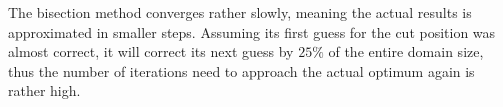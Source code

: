 \documentclass[]{article}
\begin{document}
The bisection method converges rather slowly, meaning the actual results is approximated in smaller steps. Assuming its first guess for the cut position was almost correct, it will correct its next guess by $25\%$ of the entire domain size, thus the number of iterations need to approach the actual optimum again is rather high.

\begin{comment}

\subsubsection{Binary Search with improved guessing}

As we can see in \ref{algo:cut}, the initial guess of the cut is simply the center of the domain. But if we consider non uniform distributions, this initial guess can possibly rather bad. Let us consider the following example:

\begin{figure}[H]
	\begin{center}
		\begin{tikzpicture}
			\def\mean{0.1}
			\def\sigma{0.1}
			\def\pi{3.14159265359}
			\begin{axis}[xmin = 0, xmax = 1, ymin=0, ymax=5, samples=60]
				\addplot[domain = 0:1,blue] {1 / (\sigma * sqrt(2 * \pi)) * exp(-0.5 * ((x - \mean) / \sigma)^2) };
				\draw (axis cs:0.5,0) -- node[left]{$c_0$} (axis cs:0.5,5);
				\draw (axis cs:0.25,0) -- node[left]{$c_1$} (axis cs:0.25,5);
				\draw (axis cs:0.125,0) -- node[left]{$c_2$} (axis cs:0.125,5);
			\end{axis}
		\end{tikzpicture}
	\end{center}
	\caption{3 iterations of binary search with naive initial guess}\label{euclid}
\end{figure}

The underlying distribution is a normal distribution. \TODO{Add reference to section about data}. We can see that the algorithm will have to sweep 3 times over the entire array to get into the region of the actual median. One suggestion for improvement is to use an approximated median as a guess for the first split. We can sample 100 particles and find their median in constant time. Then we will run the binary cut algorithm using the approximated median as an initial guess. This can reduce the runtime by a few iterations, however we cannot make any assessment about the runtime, as this improvement will make the algorithm even slower on some distributions. Let us for example consider the uniform distribution, in this case the addition is pure overhead as the center is already the most accurate initial guess.
\end{comment}
\end{document}
